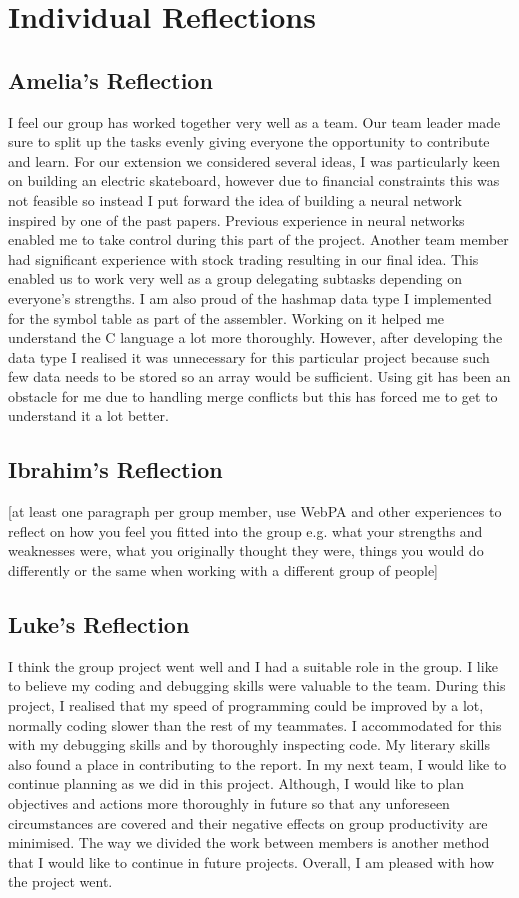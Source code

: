 \documentclass[11pt]{article}
\begin{document}
\section{Individual Reflections}
\subsection{Amelia's Reflection}
I feel our group has worked together very well as a team. Our team leader made sure to split up the tasks evenly giving everyone the opportunity to contribute and learn. For our extension we considered several ideas, I was particularly keen on building an electric skateboard, however due to financial constraints this was not feasible so instead I put forward the idea of building a neural network inspired by one of the past papers. Previous experience in neural networks enabled me to take control during this part of the project. Another team member had significant experience with stock trading resulting in our final idea. This enabled us to work very well as a group delegating subtasks depending on everyone's strengths. I am also proud of the hashmap data type I implemented for the symbol table as part of the assembler. Working on it helped me understand the C language a lot more thoroughly. However, after developing the data type I realised it was unnecessary for this particular project because such few data needs to be stored so an array would be sufficient. Using git has been an obstacle for me due to handling merge conflicts but this has forced me to get to understand it a lot better.


\subsection{Ibrahim's Reflection}
[at least one paragraph per group member, use WebPA and other experiences to reflect on how you feel you fitted into the group e.g. what your strengths and weaknesses were, what you originally thought they were, things you would do differently or the same when working with a different group of people]

\subsection{Luke's Reflection}
I think the group project went well and I had a suitable role in the group.
I like to believe my coding and debugging skills were valuable to the team.
During this project, I realised that my speed of programming could be improved by a lot,
normally coding slower than the rest of my teammates. I accommodated for this
with my debugging skills and by thoroughly inspecting code.
My literary skills also found a place in contributing to the report.
In my next team, I would like to continue planning as we did in this project.
Although, I would like to plan objectives and actions more thoroughly in future so that
any unforeseen circumstances are covered and their negative effects on group 
productivity are minimised. The way we divided the work between members is another
method that I would like to continue in future projects.
Overall, I am pleased with how the project went.
\end{document}
